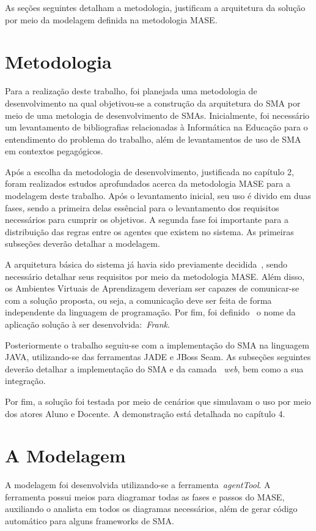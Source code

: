 As seções seguintes detalham a metodologia, justificam a arquitetura da solução por meio da modelagem definida na metodologia MASE.

\section{Metodologia}
Para a realização deste trabalho, foi planejada uma metodologia de desenvolvimento na qual objetivou-se a construção da arquitetura do SMA por meio de uma metologia de desenvolvimento de SMAs. Inicialmente, foi necessário um levantamento de bibliografias relacionadas à Informática na Educação para o entendimento do problema do trabalho, além de levantamentos de uso de SMA em contextos pegagógicos.

Após a escolha da metodologia de desenvolvimento, justificada no capítulo 2, foram realizados estudos aprofundados acerca da metodologia MASE para a modelagem deste trabalho. Após o levantamento inicial, seu uso é divido em duas fases, sendo a primeira delas essêncial para o levantamento dos requisitos necessários para cumprir os objetivos. A segunda fase foi importante para a distribuição das regras entre os agentes que existem no sistema. As primeiras subseções deverão detalhar a modelagem.

A arquitetura básica do sistema já havia sido previamente decidida~\cite{editalFrank}, sendo necessário detalhar seus requisitos por meio da metodologia MASE. Além disso, os Ambientes Virtuais de Aprendizagem deveriam ser capazes de comunicar-se com a solução proposta, ou seja, a comunicação deve ser feita de forma independente da linguagem de programação. Por fim, foi definido~\cite{editalFrank} o nome da aplicação solução à ser desenvolvida:~\emph{Frank}.

Posteriormente o trabalho seguiu-se com a implementação do SMA na linguagem JAVA, utilizando-se das ferramentas JADE e JBoss Seam. As subseções seguintes deverão detalhar a implementação do SMA e da camada ~\emph{web}, bem como a sua integração.

Por fim, a solução foi testada por meio de cenários que simulavam o uso por meio dos atores Aluno e Docente. A demonstração está detalhada no capítulo 4.

\section{A Modelagem}

A modelagem foi desenvolvida utilizando-se a ferramenta~\emph{agentTool}. A ferramenta possui meios para diagramar todas as fases e passos do MASE, auxiliando o analista em todos os diagramas necessários, além de gerar código automático para alguns frameworks de SMA.


